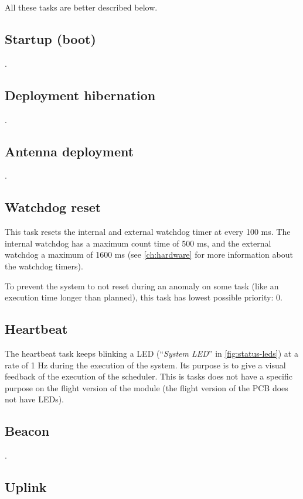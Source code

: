 All these tasks are better described below.

\subsection{Startup (boot)}

.

\subsection{Deployment hibernation}

.

\subsection{Antenna deployment}

.

\subsection{Watchdog reset}

This task resets the internal and external watchdog timer at every 100 ms. The internal watchdog has a maximum count time of 500 ms, and the external watchdog a maximum of 1600 ms (see \autoref{ch:hardware} for more information about the watchdog timers).

To prevent the system to not reset during an anomaly on some task (like an execution time longer than planned), this task has lowest possible priority: 0.

\subsection{Heartbeat}

The heartbeat task keeps blinking a LED (``\textit{System LED}'' in \autoref{fig:status-leds}) at a rate of 1 Hz during the execution of the system. Its purpose is to give a visual feedback of the execution of the scheduler. This is tasks does not have a specific purpose on the flight version of the module (the flight version of the PCB does not have LEDs).

\subsection{Beacon}

.

\subsection{Uplink}

